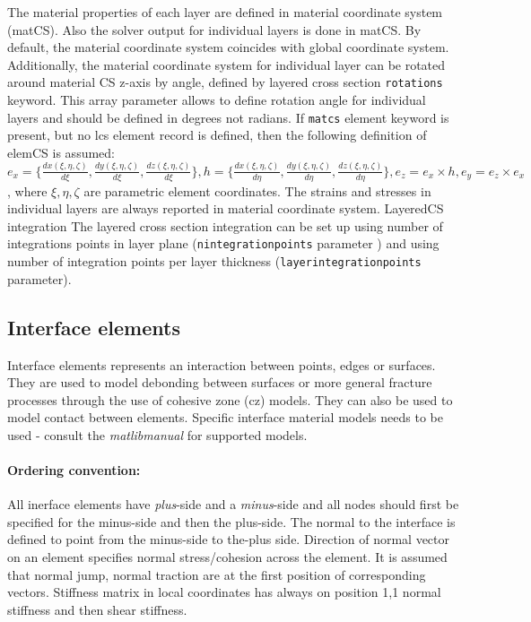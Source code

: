 \documentclass[a4paper]{article}
\newcommand{\param}[1]{\texttt{#1}} %
\begin{document}
The material properties of each layer are defined in material coordinate system (matCS). 
Also the solver output for individual layers is done in matCS.
By default, the material coordinate system coincides with global coordinate system.
Additionally, the material coordinate system for individual layer can be rotated around material CS z-axis by angle, defined by layered cross section \param{rotations} keyword. This array parameter allows to define rotation angle for individual layers and should be defined in degrees not radians.
If \param{matcs} element keyword is present, but no lcs element record is defined, then the following definition of elemCS is assumed: 
$e_x=\{\frac{dx(\xi,\eta,\zeta)}{d\xi},\frac{dy(\xi,\eta,\zeta)}{d\xi},\frac{dz(\xi,\eta,\zeta)}{d\xi}\}, 
h=\{\frac{dx(\xi,\eta,\zeta)}{d\eta},\frac{dy(\xi,\eta,\zeta)}{d\eta},\frac{dz(\xi,\eta,\zeta)}{d\eta}\},
e_z=e_x\times h, e_y=e_z\times e_x$,
where $\xi,\eta,\zeta$ are parametric element coordinates. 
The strains and stresses in individual layers are always reported in material coordinate system.
LayeredCS integration 
The layered cross section  integration can be set up using number of integrations points in
layer plane (\param{nintegrationpoints} parameter ) and using number of integration points per layer
 thickness (\param{layerintegrationpoints} parameter).

\clearpage
\subsection{Interface elements}
Interface elements represents an interaction between points, edges or surfaces. They are used to model debonding between surfaces or more general fracture processes through the use of cohesive zone (cz) models. They can also be used to model contact between elements. Specific interface material models needs to be used - consult the {\it matlibmanual} for supported models. 

\paragraph{Ordering convention:} All inerface elements have \emph{plus}-side and a \emph{minus}-side and all nodes should first be specified for the minus-side and then the plus-side. The normal to the interface is defined to point from the minus-side to the-plus side. Direction of normal vector on an element specifies normal stress/cohesion across the element. It is assumed that normal jump, normal traction are at the first position of corresponding vectors. Stiffness matrix in local coordinates has always on position 1,1 normal stiffness and then shear stiffness.
\end{document}
